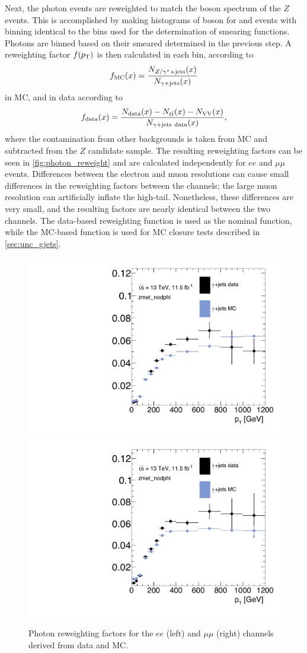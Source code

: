 Next, the photon events are reweighted to match the boson \pt spectrum of the $Z$ events. This is accomplished by making histograms of boson \pt for \gjets and \dyjets events with binning identical to the \pt bins used for the determination of smearing functions. Photons are binned based on their smeared \pt determined in the previous step. A reweighting factor $f(p_{\text{T}})$ is then calculated in each bin, according to
%
\begin{equation}
f_\text{MC}(x) = \frac{N_{Z/\gamma^{*}+\text{jets}}(x)}{N_{\gamma+\text{jets}}(x)}
\end{equation}
%
in \ac{MC}, and in data according to
%
\begin{equation}
f_\text{data}(x) = \frac{N_{\text{data}}(x)-N_{t\bar{t}}(x)-N_{\text{VV}}(x)}{N_{\gjets\ \text{data}}(x)} ,
\end{equation}
%
where the contamination from other backgrounds is taken from \ac{MC} and subtracted from the $Z$ candidate sample. The resulting reweighting factors can be seen in \autoref{fig:photon_reweight} and are calculated independently for $ee$ and $\mu\mu$ events. Differences between the electron and muon resolutions can cause small differences in the \pt reweighting factors between the channels; the large muon resolution can artificially inflate the high-\pt tail. Nonetheless, these differences are very small, and the resulting factors are nearly identical between the two channels. The data-based reweighting function is used as the nominal function, while the \ac{MC}-based function is used for \ac{MC} closure tests described in \autoref{sec:unc_gjets}. 

\begin{centering}
\begin{figure}[!hbt]
\myfloatalign
\includegraphics[width=.48\linewidth]{figures/photons/Corr_hist_ptrw_ee_2j_2016_mcmetl_ptsmrw_smear_zmet_nodphi_.pdf}
\includegraphics[width=.48\linewidth]{figures/photons/Corr_hist_ptrw_mm_2j_2016_mcmetl_ptsmrw_smear_zmet_nodphi_.pdf}
\caption{Photon reweighting factors for the $ee$ (left) and $\mu\mu$ (right) channels derived from data and \ac{MC}.}
\label{fig:photon_reweight}
\end{figure}
\end{centering}

